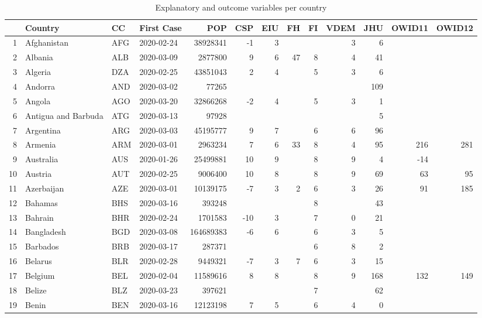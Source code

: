 \begingroup\scriptsize
\begin{longtable}{rlllrrrrrrrrr}
\caption{Explanatory and outcome variables per country} \\ 
  \hline
& Country & CC & First Case & POP & CSP & EIU & FH & FI & VDEM & JHU & OWID11 & OWID12 \\ 
  \hline
1 & Afghanistan & AFG & 2020-02-24 & 38928341 & -1 & 3 &  &  & 3 & 6 &  &  \\ 
  2 & Albania & ALB & 2020-03-09 & 2877800 & 9 & 6 & 47 & 8 & 4 & 41 &  &  \\ 
  3 & Algeria & DZA & 2020-02-25 & 43851043 & 2 & 4 &  & 5 & 3 & 6 &  &  \\ 
  4 & Andorra & AND & 2020-03-02 & 77265 &  &  &  &  &  & 109 &  &  \\ 
  5 & Angola & AGO & 2020-03-20 & 32866268 & -2 & 4 &  & 5 & 3 & 1 &  &  \\ 
  6 & Antigua and Barbuda & ATG & 2020-03-13 & 97928 &  &  &  &  &  & 5 &  &  \\ 
  7 & Argentina & ARG & 2020-03-03 & 45195777 & 9 & 7 &  & 6 & 6 & 96 &  &  \\ 
  8 & Armenia & ARM & 2020-03-01 & 2963234 & 7 & 6 & 33 & 8 & 4 & 95 & 216 & 281 \\ 
  9 & Australia & AUS & 2020-01-26 & 25499881 & 10 & 9 &  & 8 & 9 & 4 & -14 &  \\ 
  10 & Austria & AUT & 2020-02-25 & 9006400 & 10 & 8 &  & 8 & 9 & 69 & 63 & 95 \\ 
  11 & Azerbaijan & AZE & 2020-03-01 & 10139175 & -7 & 3 & 2 & 6 & 3 & 26 & 91 & 185 \\ 
  12 & Bahamas & BHS & 2020-03-16 & 393248 &  &  &  & 8 &  & 43 &  &  \\ 
  13 & Bahrain & BHR & 2020-02-24 & 1701583 & -10 & 3 &  & 7 & 0 & 21 &  &  \\ 
  14 & Bangladesh & BGD & 2020-03-08 & 164689383 & -6 & 6 &  & 6 & 3 & 5 &  &  \\ 
  15 & Barbados & BRB & 2020-03-17 & 287371 &  &  &  & 6 & 8 & 2 &  &  \\ 
  16 & Belarus & BLR & 2020-02-28 & 9449321 & -7 & 3 & 7 & 6 & 3 & 15 &  &  \\ 
  17 & Belgium & BEL & 2020-02-04 & 11589616 & 8 & 8 &  & 8 & 9 & 168 & 132 & 149 \\ 
  18 & Belize & BLZ & 2020-03-23 & 397621 &  &  &  & 7 &  & 62 &  &  \\ 
  19 & Benin & BEN & 2020-03-16 & 12123198 & 7 & 5 &  & 6 & 4 & 0 &  &  \\ 

\end{longtable}
